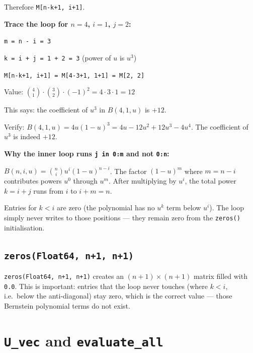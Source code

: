 \documentclass[12pt, a4paper]{article}
\newcommand{\cd}[1]{\texttt{#1}}
\begin{document}
Therefore \cd{M[n-k+1, i+1]}.

\begin{examplebox}
\textbf{Trace the loop for $n=4$, $i=1$, $j=2$:}

\cd{m = n - i = 3}

\cd{k = i + j = 1 + 2 = 3} \quad (power of $u$ is $u^3$)

\cd{M[n-k+1, i+1] = M[4-3+1, 1+1] = M[2, 2]}

Value: $\binom{4}{1} \cdot \binom{3}{2} \cdot (-1)^2 = 4 \cdot 3 \cdot 1 = 12$

This says: the coefficient of $u^3$ in $B(4,1,u)$ is $+12$.

Verify: $B(4,1,u) = 4u(1-u)^3 = 4u - 12u^2 + 12u^3 - 4u^4$.
The coefficient of $u^3$ is indeed $+12$. \checkmark
\end{examplebox}

\begin{examplebox}
\textbf{Why the inner loop runs \cd{j in 0:m} and not \cd{0:n}:}

$B(n,i,u) = \binom{n}{i} u^i (1-u)^{n-i}$.
The factor $(1-u)^m$ where $m = n-i$ contributes powers
$u^0$ through $u^m$.
After multiplying by $u^i$, the total power $k = i+j$
runs from $i$ to $i+m = n$.

Entries for $k < i$ are zero (the polynomial has no $u^k$
term below $u^i$).
The loop simply never writes to those positions ---
they remain zero from the \cd{zeros()} initialisation.
\end{examplebox}

\subsection{\texttt{zeros(Float64, n+1, n+1)}}

\cd{zeros(Float64, n+1, n+1)} creates an $(n+1) \times (n+1)$
matrix filled with \cd{0.0}.
This is important: entries that the loop never touches
(where $k < i$, i.e.\ below the anti-diagonal) stay zero,
which is the correct value --- those Bernstein polynomial
terms do not exist.


\section{\texttt{U\_vec} and \texttt{evaluate\_all}}

\end{document}

